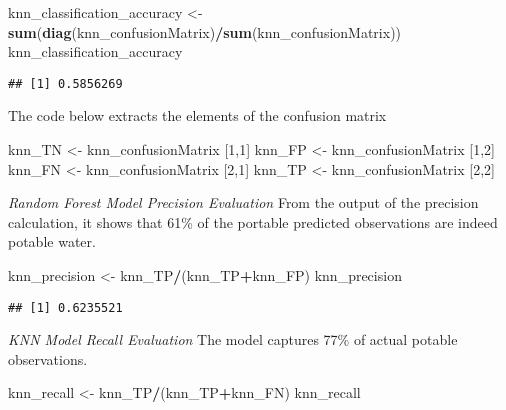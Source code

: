 \documentclass[
]{article}
\newenvironment{Shaded}{\begin{snugshade}}{\end{snugshade}}
\newcommand{\DecValTok}[1]{\textcolor[rgb]{0.00,0.00,0.81}{#1}}
\newcommand{\FunctionTok}[1]{\textcolor[rgb]{0.13,0.29,0.53}{\textbf{#1}}}
\newcommand{\NormalTok}[1]{#1}
\newcommand{\OtherTok}[1]{\textcolor[rgb]{0.56,0.35,0.01}{#1}}
\newcommand{\SpecialCharTok}[1]{\textcolor[rgb]{0.81,0.36,0.00}{\textbf{#1}}}
\begin{document}
\begin{Shaded}
\begin{Highlighting}[]
\NormalTok{knn\_classification\_accuracy }\OtherTok{\textless{}{-}} \FunctionTok{sum}\NormalTok{(}\FunctionTok{diag}\NormalTok{(knn\_confusionMatrix)}\SpecialCharTok{/}\FunctionTok{sum}\NormalTok{(knn\_confusionMatrix))}
\NormalTok{knn\_classification\_accuracy}
\end{Highlighting}
\end{Shaded}

\begin{verbatim}
## [1] 0.5856269
\end{verbatim}

The code below extracts the elements of the confusion matrix

\begin{Shaded}
\begin{Highlighting}[]
\NormalTok{knn\_TN }\OtherTok{\textless{}{-}}\NormalTok{ knn\_confusionMatrix [}\DecValTok{1}\NormalTok{,}\DecValTok{1}\NormalTok{]}
\NormalTok{knn\_FP }\OtherTok{\textless{}{-}}\NormalTok{ knn\_confusionMatrix [}\DecValTok{1}\NormalTok{,}\DecValTok{2}\NormalTok{]}
\NormalTok{knn\_FN }\OtherTok{\textless{}{-}}\NormalTok{ knn\_confusionMatrix [}\DecValTok{2}\NormalTok{,}\DecValTok{1}\NormalTok{]}
\NormalTok{knn\_TP }\OtherTok{\textless{}{-}}\NormalTok{ knn\_confusionMatrix [}\DecValTok{2}\NormalTok{,}\DecValTok{2}\NormalTok{]}
\end{Highlighting}
\end{Shaded}

\emph{Random Forest Model Precision Evaluation} From the output of the
precision calculation, it shows that 61\% of the portable predicted
observations are indeed potable water.

\begin{Shaded}
\begin{Highlighting}[]
\NormalTok{knn\_precision }\OtherTok{\textless{}{-}}\NormalTok{ knn\_TP}\SpecialCharTok{/}\NormalTok{(knn\_TP}\SpecialCharTok{+}\NormalTok{knn\_FP)}
\NormalTok{knn\_precision}
\end{Highlighting}
\end{Shaded}

\begin{verbatim}
## [1] 0.6235521
\end{verbatim}

\emph{KNN Model Recall Evaluation} The model captures 77\% of actual
potable observations.

\begin{Shaded}
\begin{Highlighting}[]
\NormalTok{knn\_recall }\OtherTok{\textless{}{-}}\NormalTok{ knn\_TP}\SpecialCharTok{/}\NormalTok{(knn\_TP}\SpecialCharTok{+}\NormalTok{knn\_FN)}
\NormalTok{knn\_recall}
\end{Highlighting}
\end{Shaded}
\end{document}
